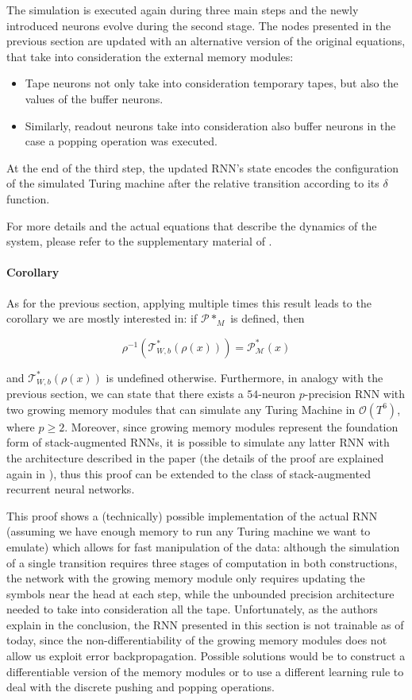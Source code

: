 \documentclass{article}
\begin{document}
The simulation is executed again during three main steps and the newly introduced neurons evolve during the second stage. The nodes presented in the previous section are updated with an alternative version of the original equations, that take into consideration the external memory modules:

\begin{itemize}
    \item Tape neurons not only take into consideration temporary tapes, but also the values of the buffer neurons.
    \item Similarly, readout neurons take into consideration also buffer neurons in the case a popping operation was executed.
\end{itemize}

At the end of the third step, the updated RNN's state encodes the configuration of the simulated Turing machine after the relative transition according to its $\delta$ function.

For more details and the actual equations that describe the dynamics of the system, please refer to the supplementary material of \cite{CHU21}.

\paragraph{Corollary}
As for the previous section, applying multiple times this result leads to the corollary we are mostly interested in: if $\mathcal{P}*_{M}$ is defined, then

$$\rho^{-1}(\mathcal{T}^*_{W,b}(\rho(x))) = \mathcal{P}^*_{\mathcal{M}}(x)$$

and $\mathcal{T}^*_{W,b}(\rho(x))$ is undefined otherwise.
Furthermore, in analogy with the previous section, we can state that there exists a $54$-neuron $p$-precision RNN with two growing memory modules that can simulate any Turing Machine in $\mathcal{O}(T^6)$, where $p \geq 2$. Moreover, since growing memory modules represent the foundation form of stack-augmented RNNs, it is possible to simulate any latter RNN with the architecture described in the paper (the details of the proof are explained again in \cite{CHU21}), thus this proof can be extended to the class of stack-augmented recurrent neural networks.

This proof shows a (technically) possible implementation of the actual RNN (assuming we have enough memory to run any Turing machine we want to emulate) which allows for fast manipulation of the data: although the simulation of a single transition requires three stages of computation in both constructions, the network with the growing memory module only requires updating the symbols near the head at each step, while the unbounded precision architecture needed to take into consideration all the tape.
Unfortunately, as the authors explain in the conclusion, the RNN presented in this section is not trainable as of today, since the non-differentiability of the growing memory modules does not allow us exploit error backpropagation. Possible solutions would be to construct a differentiable version of the memory modules or to use a different learning rule to deal with the discrete pushing and popping operations.
\end{document}
